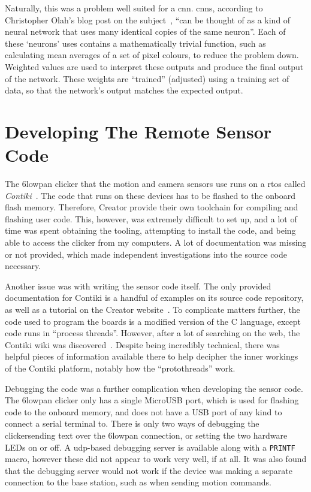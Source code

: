 Naturally, this was a problem well suited for a \acrfull{cnn}.
\acrshort{cnn}s, according to Christopher Olah's blog post on the
subject~\cite{olah2014conv}, ``can be thought of as a kind of neural network
that uses many identical copies of the same neuron''. Each of these `neurons'
uses contains a mathematically trivial function, such as calculating mean
averages of a set of pixel colours, to reduce the problem down. Weighted
values are used to interpret these outputs and produce the final output of
the network. These weights are ``trained'' (adjusted) using a training set of
data, so that the network's output matches the expected output.

\section{Developing The Remote Sensor Code}
The \gls{6lowpan} clicker that the motion and camera sensors use runs on a
\acrfull{rtos} called \textit{Contiki}~\cite{contiki}. The code that runs on
these devices has to be flashed to the onboard flash memory. Therefore,
Creator provide their own toolchain for compiling and flashing user code.
This, however, was extremely difficult to set up, and a lot of time was spent
obtaining the tooling, attempting to install the code, and being able to
access the clicker from my computers. A lot of documentation was missing or
not provided, which made independent investigations into the source code
necessary.

Another issue was with writing the sensor code itself. The only provided
documentation for Contiki is a handful of examples on its source code
repository, as well as a tutorial on the Creator
website~\cite{clickersetupguide}. To complicate matters further, the code
used to program the boards is a modified version of the C language, except
code runs in ``process threads''. However, after a lot of searching on the
web, the Contiki wiki was discovered~\cite{contiki-wiki}. Despite being
incredibly technical, there was helpful pieces of information available there
to help decipher the inner workings of the Contiki platform, notably how the
``protothreads'' work.

Debugging the code was a further complication when developing the sensor
code. The \gls{6lowpan} clicker only has a single MicroUSB port, which is
used for flashing code to the onboard memory, and does not have a USB port of
any kind to connect a serial terminal to. There is only two ways of debugging
the clicker\textemdash{}sending text over the \gls{6lowpan} connection, or
setting the two hardware LEDs on or off. A \acrshort{udp}-based debugging
server is available along with a \texttt{PRINTF} macro, however these did not
appear to work very well, if at all. It was also found that the debugging
server would not work if the device was making a separate connection to the
base station, such as when sending motion commands.

